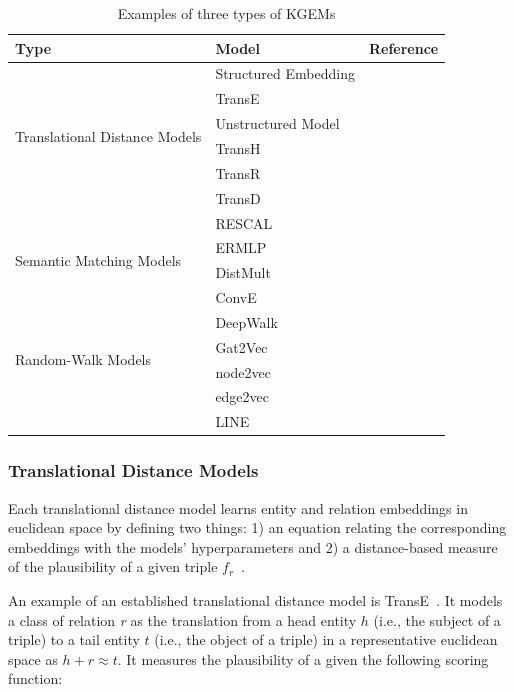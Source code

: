 \begin{table}
    \centering
    \begin{tabular}{ l l l }
        \hline
        Type & Model & Reference \\
        \hline
        \multirow{6}{*}{Translational Distance Models}
        & Structured Embedding & ~\cite{Bordes2011}  \\
        & TransE & ~\cite{Bordes2013} \\
        & Unstructured Model & ~\cite{Bordes2014} \\
        & TransH & ~\cite{Wang2014} \\
        & TransR & ~\cite{Lin2015} \\
        & TransD & ~\cite{Ji2015} \\
        \hline
        \multirow{4}{*}{Semantic Matching Models}
        & RESCAL & ~\cite{Nickel2011} \\
        & ERMLP & ~\cite{Dong2014} \\
        & DistMult & ~\cite{Yang2014}  \\
        & ConvE & ~\cite{Dettmers2017} \\
        \hline
        \multirow{4}{*}{Random-Walk Models}
        & DeepWalk & ~\cite{Perozzi2014} \\
        & Gat2Vec & ~\cite{Sheikh2018} \\
        & node2vec & ~\cite{Grover2016} \\
        & edge2vec & ~\cite{Gao2018} \\
        & LINE & ~\cite{Tang2015} \\
        \hline
    \end{tabular}
    \caption{Examples of three types of \acp{KGEM}}\label{tab:kgem_examples}
\end{table}

\subsubsection{Translational Distance Models}

Each translational distance model learns entity and relation embeddings in euclidean space by defining two things: 1) an equation relating the corresponding embeddings with the models' hyperparameters and 2) a distance-based measure of the plausibility of a given triple $f_r$~\cite{Wang2017}.

An example of an established translational distance model is TransE~\cite{Bordes2013}.
It models a class of relation \textit{r} as the translation from a head entity $h$ (i.e., the subject of a triple) to a tail entity $t$ (i.e., the object of a triple) in a representative euclidean space as $h + r \approx t$.
It measures the plausibility of a given the following scoring function:

